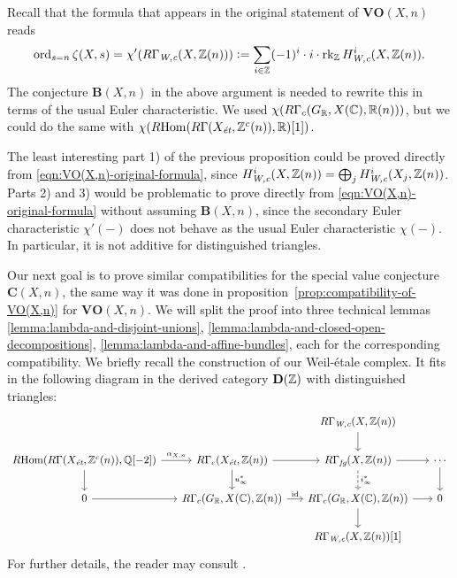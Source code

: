 \documentclass{article}
\numberwithin{equation}{section}
\begin{document}
\begin{remark}
  Recall that the formula that appears in the original statement of
  $\mathbf{VO} (X,n)$ reads
  \begin{equation}
    \label{eqn:VO(X,n)-original-formula}
    \ord_{s=n} \zeta (X,s) = \chi' (R\Gamma_\Wc (X,\ZZ(n))) \dfn
    \sum_{i\in \ZZ} (-1)^i\cdot i \cdot \rk_\ZZ H^i_\Wc (X,\ZZ(n)).
  \end{equation}
  The conjecture $\mathbf{B} (X,n)$ in the above argument is needed to rewrite
  this in terms of the usual Euler characteristic. We used
  $\chi (R\Gamma_c (G_\RR, X (\CC), \RR (n)))$, but we could do the same with
  $\chi (\RHom (R\Gamma (X_\et, \ZZ^c (n)), \RR) [1])$.

  The least interesting part 1) of the previous proposition could be proved
  directly from \eqref{eqn:VO(X,n)-original-formula}, since
  $H^i_\Wc (X,\ZZ(n)) = \bigoplus_j H^i_\Wc (X_j,\ZZ(n))$. Parts 2) and 3) would
  be problematic to prove directly from \eqref{eqn:VO(X,n)-original-formula}
  without assuming $\mathbf{B} (X,n)$, since the secondary Euler characteristic
  $\chi' (-)$ does not behave as the usual Euler characteristic $\chi (-)$.
  In particular, it is not additive for distinguished triangles.
\end{remark}

Our next goal is to prove similar compatibilities for the special value
conjecture $\mathbf{C} (X,n)$, the same way it was done in
proposition~\ref{prop:compatibility-of-VO(X,n)} for $\mathbf{VO} (X,n)$.
We will split the proof into three technical lemmas
\ref{lemma:lambda-and-disjoint-unions},
\ref{lemma:lambda-and-closed-open-decompositions},
\ref{lemma:lambda-and-affine-bundles},
each for the corresponding compatibility. We briefly recall the construction of
our Weil-étale complex. It fits in the following diagram in the derived
category $\mathbf{D} (\ZZ)$ with distinguished triangles:
\[ \begin{tikzcd}[column sep=1.5em]
    & & R\Gamma_\Wc (X, \ZZ (n)) \ar{d} \\
    \RHom (R\Gamma (X_\et, \ZZ^c (n)), \QQ [-2]) \ar{r}{\alpha_{X,n}}\ar{d} & R\Gamma_c (X_\et, \ZZ (n)) \ar{r}\ar{d}{u_\infty^*} & R\Gamma_\fg (X, \ZZ(n)) \ar{r}\ar[dashed]{d}{i_\infty^*} & \cdots \ar{d} \\
    0 \ar{r} & R\Gamma_c (G_\RR, X (\CC), \ZZ(n)) \ar{r}{\mathrm{id}} & R\Gamma_c (G_\RR, X (\CC), \ZZ(n)) \ar{r}\ar{d} & 0 \\
    & & R\Gamma_\Wc (X, \ZZ (n)) [1]
  \end{tikzcd} \]
For further details, the reader may consult \cite{Beshenov-Weil-etale-1}.
\end{document}
